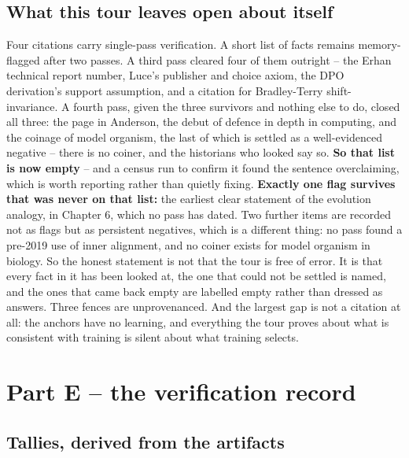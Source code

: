 \section*{What this tour leaves open about itself}

Four citations carry single-pass verification. A short list of facts remains memory-flagged after two passes. A third pass cleared four of them outright -- the Erhan technical report number, Luce's publisher and choice axiom, the DPO derivation's support assumption, and a citation for Bradley-Terry shift-invariance. A fourth pass, given the three survivors and nothing else to do, closed all three: the page in Anderson, the debut of defence in depth in computing, and the coinage of model organism, the last of which is settled as a well-evidenced negative -- there is no coiner, and the historians who looked say so. \textbf{So that list is now empty} -- and a census run to confirm it found the sentence overclaiming, which is worth reporting rather than quietly fixing. \textbf{Exactly one flag survives that was never on that list:} the earliest clear statement of the evolution analogy, in Chapter 6, which no pass has dated. Two further items are recorded not as flags but as persistent negatives, which is a different thing: no pass found a pre-2019 use of inner alignment, and no coiner exists for model organism in biology. So the honest statement is not that the tour is free of error. It is that every fact in it has been looked at, the one that could not be settled is named, and the ones that came back empty are labelled empty rather than dressed as answers. Three fences are unprovenanced. And the largest gap is not a citation at all: the anchors have no learning, and everything the tour proves about what is consistent with training is silent about what training selects.

\chapter*{Part E -- the verification record}

\section*{Tallies, derived from the artifacts}

\noindent


